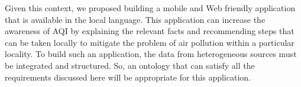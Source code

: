 Given this context, we proposed building a mobile and Web friendly application that is available in the local language. This application can increase the awareness of AQI by explaining the relevant facts and recommending steps that can be taken locally to mitigate the problem of air pollution within a particular locality. To build such an application, the data from heterogeneous sources must be integrated and structured. So, an ontology that can satisfy all the requirements discussed here will be appropriate for this application.   






